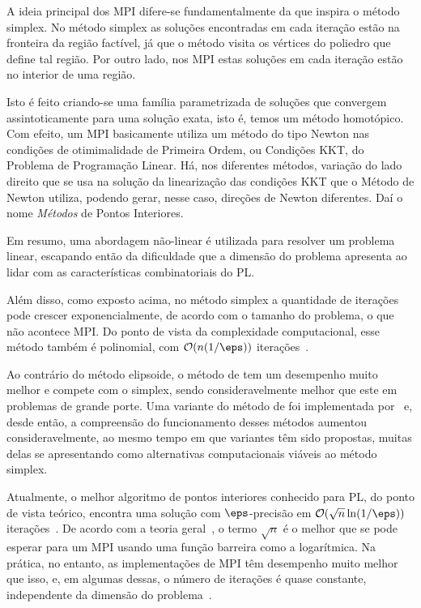 A ideia principal dos \ac{MPI} difere-se fundamentalmente da que inspira o
método simplex. No método simplex as soluções encontradas em cada iteração estão
na fronteira da região factível, já que o método visita os vértices do poliedro
que define tal região. Por outro lado, nos \ac{MPI} estas soluções em cada
iteração estão no interior de uma região. 

Isto é feito criando-se uma família
parametrizada de soluções que convergem assintoticamente para uma solução exata,
isto é, temos  um método homotópico. Com efeito, um \ac{MPI} basicamente utiliza um método do tipo Newton nas condições de otimimalidade de Primeira Ordem, ou Condições KKT, do Problema de Programação Linear. Há, nos diferentes métodos, variação  do lado direito que se usa na solução da linearização das condições KKT que o Método de Newton utiliza, podendo gerar, nesse caso,  direções de Newton diferentes. Daí o nome \emph{Métodos} de Pontos Interiores. 

Em resumo,  uma abordagem não-linear é utilizada para resolver um problema
linear, escapando então da  dificuldade que a dimensão do problema apresenta ao
 lidar com as características combinatoriais  do \ac{PL}.


Além disso,  como exposto acima,  no método simplex a quantidade de
iterações pode crescer exponencialmente, de acordo com o tamanho do problema,  o que não acontece  \ac{MPI}. Do ponto de vista
da complexidade computacional, esse método também é polinomial,  com
$\mathcal{O}(n(1/\eps))$ iterações~\cite{Karmarkar:1984cp}.
 
  
Ao contrário do método elipsoide, o método de \citeauthor{Karmarkar:1984cp} tem um desempenho muito
melhor e compete com o simplex, sendo consideravelmente melhor  que este em
problemas de grande porte. Uma variante do método de \citeauthor{Karmarkar:1984cp} foi implementada
por~\textcite{Adler:1989fw} e, desde então, a compreensão do funcionamento desses
métodos aumentou consideravelmente, ao mesmo tempo em que variantes têm
sido propostas, muitas delas se apresentando como alternativas computacionais
viáveis ao método simplex.

Atualmente, o melhor algoritmo de pontos interiores conhecido para \ac{PL},  do ponto de vista teórico, 
encontra uma solução com $\eps$-precisão em $\Oset(\sqrt{n}\ln(1/\eps))$
iterações~\cite{Renegar:1988cr}.
De acordo com a teoria geral~\cite[Capítulo 4]{Nesterov:2003wi}, o termo
$\sqrt{n}$  é o melhor que se pode esperar para um \ac{MPI} usando uma função barreira como a
logarítmica. Na prática, no entanto, as implementações de \ac{MPI}  têm desempenho muito melhor que
isso, e, em algumas dessas, o número de iterações é quase constante, independente da dimensão do
problema~\cite{Colombo:2008ia}.

